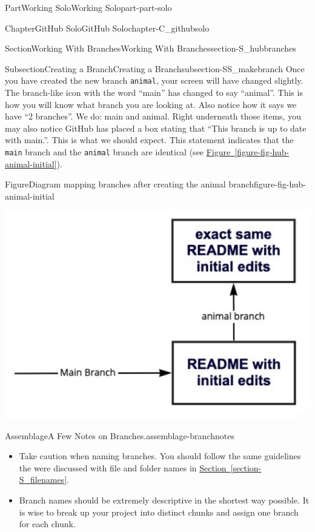 \documentclass[oneside,10pt,]{book}
\newcommand{\xreffont}{\relax}
\newcommand{\mono}[1]{\texttt{#1}}
\begin{document}
\begin{partptx}{Part}{Working Solo}{}{Working Solo}{}{}{part-part-solo}
\begin{chapterptx}{Chapter}{GitHub Solo}{}{GitHub Solo}{}{}{chapter-C_githubsolo}
\begin{sectionptx}{Section}{Working With Branches}{}{Working With Branches}{}{}{section-S_hubbranches}
\begin{subsectionptx}{Subsection}{Creating a Branch}{}{Creating a Branch}{}{}{subsection-SS_makebranch}
Once you have created the new branch \mono{animal}, your screen will have changed slightly. The branch-like icon with the word ``main'' has changed to say ``animal''. This is how you will know what branch you are looking at. Also notice how it says we have ``2 branches''. We do: main and animal. Right underneath those items, you may also notice GitHub has placed a box stating that ``This branch is up to date with main.''. This is what we should expect. This statement indicates that the \mono{main} branch and the \mono{animal} branch are identical (see \hyperref[figure-fig-hub-animal-initial]{Figure~{\xreffont\ref{figure-fig-hub-animal-initial}}}).%
\begin{figureptx}{Figure}{Diagram mapping branches after creating the animal branch}{figure-fig-hub-animal-initial}{}%
\begin{image}{0.15}{0.7}{0.15}{}%
\includegraphics[width=\linewidth]{external/hub_animal_initial.pdf}
\end{image}%
\tcblower
\end{figureptx}%
\begin{assemblage}{Assemblage}{A Few Notes on Branches.}{assemblage-branchnotes}%
%
\begin{itemize}[label=\textbullet]
\item{}Take caution when naming branches. You should follow the same guidelines the were discussed with file and folder names in \hyperref[section-S_filenames]{Section~{\xreffont\ref{section-S_filenames}}}.%
\item{}Branch names should be extremely descriptive in the shortest way possible. It is wise to break up your project into distinct chunks and assign one branch for each chunk.%

\end{itemize}
\end{assemblage}
\end{subsectionptx}
\end{sectionptx}
\end{chapterptx}
\end{partptx}
\end{document}
